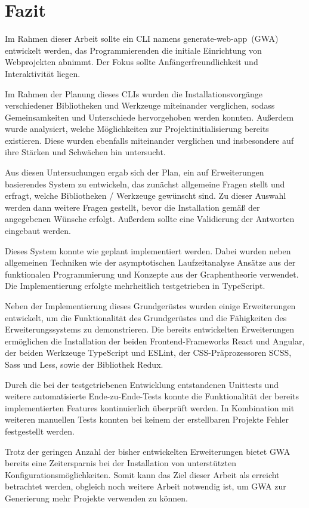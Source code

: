\section{Fazit}
\label{fazit}

Im Rahmen dieser Arbeit sollte ein \gls{CLI} namens \glqq generate-web-app\grqq\ (\gls{GWA}) entwickelt werden, das Programmierenden die initiale Einrichtung von Webprojekten abnimmt. Der Fokus sollte Anfängerfreundlichkeit und Interaktivität liegen.

Im Rahmen der Planung dieses \gls{CLI}s wurden die Installationsvorgänge verschiedener Bibliotheken und Werkzeuge miteinander verglichen, sodass Gemeinsamkeiten und Unterschiede hervorgehoben werden konnten. Außerdem wurde analysiert, welche Möglichkeiten zur Projektinitialisierung bereits existieren. Diese wurden ebenfalls miteinander verglichen und insbesondere auf ihre Stärken und Schwächen hin untersucht.

Aus diesen Untersuchungen ergab sich der Plan, ein auf Erweiterungen basierendes System zu entwickeln, das zunächst allgemeine Fragen stellt und erfragt, welche Bibliotheken / Werkzeuge gewünscht sind. Zu dieser Auswahl werden dann weitere Fragen gestellt, bevor die Installation gemäß der angegebenen Wünsche erfolgt. Außerdem sollte eine Validierung der Antworten eingebaut werden.

Dieses System konnte wie geplant implementiert werden. Dabei wurden neben allgemeinen Techniken wie der asymptotischen Laufzeitanalyse Ansätze aus der funktionalen Programmierung und Konzepte aus der Graphentheorie verwendet. Die Implementierung erfolgte mehrheitlich testgetrieben in TypeScript.

Neben der Implementierung dieses Grundgerüstes wurden einige Erweiterungen entwickelt, um die Funktionalität des Grundgerüstes und die Fähigkeiten des Erweiterungssystems zu demonstrieren. Die bereits entwickelten Erweiterungen ermöglichen die Installation der beiden Frontend-Frameworks React und Angular, der beiden Werkzeuge TypeScript und ESLint, der CSS-Präprozessoren SCSS, Sass und Less, sowie der Bibliothek Redux.

Durch die bei der testgetriebenen Entwicklung entstandenen Unittests und weitere automatisierte Ende-zu-Ende-Tests konnte die Funktionalität der bereits implementierten Features kontinuierlich überprüft werden. In Kombination mit weiteren manuellen Tests konnten bei keinem der erstellbaren Projekte Fehler festgestellt werden.

Trotz der geringen Anzahl der bisher entwickelten Erweiterungen bietet \gls{GWA} bereits eine Zeitersparnis bei der Installation von unterstützten Konfigurationsmöglichkeiten. Somit kann das Ziel dieser Arbeit als erreicht betrachtet werden, obgleich noch weitere Arbeit notwendig ist, um \gls{GWA} zur Generierung mehr Projekte verwenden zu können.

